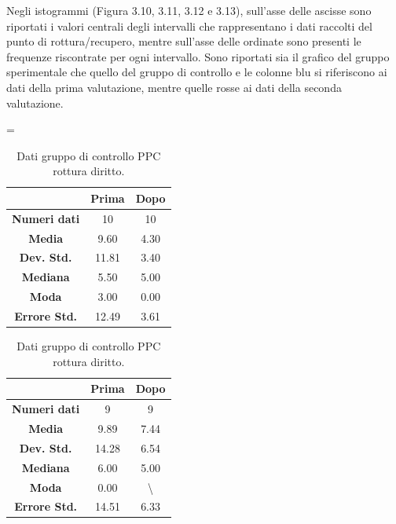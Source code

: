 Negli istogrammi (Figura 3.10, 3.11, 3.12 e 3.13), sull’asse delle ascisse sono riportati i valori centrali degli intervalli che rappresentano i dati raccolti del punto di rottura/recupero, mentre sull’asse delle ordinate sono presenti le frequenze riscontrate per ogni intervallo. Sono riportati sia il grafico del gruppo sperimentale che quello del gruppo di controllo e le colonne blu si riferiscono ai dati della prima valutazione, mentre quelle rosse ai dati della seconda valutazione.
\begin{table}
\centering
\setlength\tabcolsep{4pt}
\begin{minipage}{0.48\textwidth}
\centering
\tablewidth=\textwidth

\begin{tabular}{|c|c|c|} \hline
{\textbf{}} & {\textbf{  \hspace{8pt}Prima\hspace{8pt} }} & {\textbf{ \hspace{8pt}Dopo\hspace{8pt}  }}\\ \hline
\textbf{Numeri dati} & 10 & 10 \\ 
\textbf{Media} & 9.60 & 4.30 \\  
\textbf{Dev. Std.} & 11.81 & 3.40 \\  
\textbf{Mediana} & 5.50 & 5.00 \\ 
\textbf{Moda} & 3.00 & 0.00 \\ 
\textbf{Errore Std.} & 12.49 & 3.61 \\ 
\hline
\end{tabular}
\caption{Dati gruppo sperimentale PPC rottura diritto.}

\label{tab:accuracy} 
\end{minipage}%
\hfill
\begin{minipage}{0.48\textwidth}
\centering

\begin{tabular}{|c|c|c|} \hline
{\textbf{}} & {\textbf{  \hspace{8pt}Prima\hspace{8pt} }} & {\textbf{ \hspace{8pt}Dopo\hspace{8pt}  }}\\ \hline
\textbf{Numeri dati} & 9 & 9 \\ 
\textbf{Media} & 9.89 & 7.44 \\  
\textbf{Dev. Std.} & 14.28 & 6.54 \\  
\textbf{Mediana} & 6.00 & 5.00 \\  
\textbf{Moda} & 0.00 & \textbackslash \\
\textbf{Errore Std.} & 14.51 & 6.33 \\
\hline
\end{tabular}
\caption{Dati gruppo di controllo PPC rottura diritto.}


\end{minipage}
\end{table}
